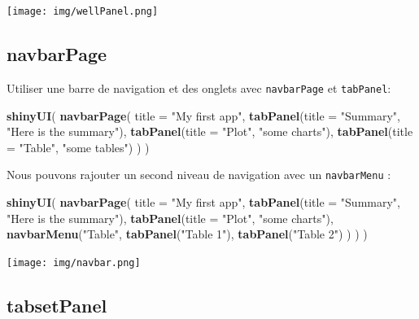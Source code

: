 \documentclass[
]{article}
\newenvironment{Shaded}{\begin{snugshade}}{\end{snugshade}}
\newcommand{\AttributeTok}[1]{\textcolor[rgb]{0.13,0.29,0.53}{#1}}
\newcommand{\FunctionTok}[1]{\textcolor[rgb]{0.13,0.29,0.53}{\textbf{#1}}}
\newcommand{\NormalTok}[1]{#1}
\newcommand{\StringTok}[1]{\textcolor[rgb]{0.31,0.60,0.02}{#1}}
\begin{document}
\texttt{[image: img/wellPanel.png]}

\hypertarget{navbarpage}{%
\subsection{navbarPage}\label{navbarpage}}

Utiliser une barre de navigation et des onglets avec \texttt{navbarPage}
et \texttt{tabPanel}:

\begin{Shaded}
\begin{Highlighting}[]
\FunctionTok{shinyUI}\NormalTok{(}
  \FunctionTok{navbarPage}\NormalTok{(}
    \AttributeTok{title =} \StringTok{"My first app"}\NormalTok{,}
    \FunctionTok{tabPanel}\NormalTok{(}\AttributeTok{title =} \StringTok{"Summary"}\NormalTok{,}
             \StringTok{"Here is the summary"}\NormalTok{),}
    \FunctionTok{tabPanel}\NormalTok{(}\AttributeTok{title =} \StringTok{"Plot"}\NormalTok{,}
             \StringTok{"some charts"}\NormalTok{),}
    \FunctionTok{tabPanel}\NormalTok{(}\AttributeTok{title =} \StringTok{"Table"}\NormalTok{,}
             \StringTok{"some tables"}\NormalTok{)}
\NormalTok{  )}
\NormalTok{)}
\end{Highlighting}
\end{Shaded}

Nous pouvons rajouter un second niveau de navigation avec un
\texttt{navbarMenu} :

\begin{Shaded}
\begin{Highlighting}[]
\FunctionTok{shinyUI}\NormalTok{(}
  \FunctionTok{navbarPage}\NormalTok{(}
    \AttributeTok{title =} \StringTok{"My first app"}\NormalTok{,}
    \FunctionTok{tabPanel}\NormalTok{(}\AttributeTok{title =} \StringTok{"Summary"}\NormalTok{,}
             \StringTok{"Here is the summary"}\NormalTok{),}
    \FunctionTok{tabPanel}\NormalTok{(}\AttributeTok{title =} \StringTok{"Plot"}\NormalTok{,}
             \StringTok{"some charts"}\NormalTok{),}
    \FunctionTok{navbarMenu}\NormalTok{(}\StringTok{"Table"}\NormalTok{,}
               \FunctionTok{tabPanel}\NormalTok{(}\StringTok{"Table 1"}\NormalTok{),}
               \FunctionTok{tabPanel}\NormalTok{(}\StringTok{"Table 2"}\NormalTok{)}
\NormalTok{    )}
\NormalTok{  )}
\NormalTok{)}
\end{Highlighting}
\end{Shaded}

\texttt{[image: img/navbar.png]}

\hypertarget{tabsetpanel}{%
\subsection{tabsetPanel}\label{tabsetpanel}}
\end{document}
